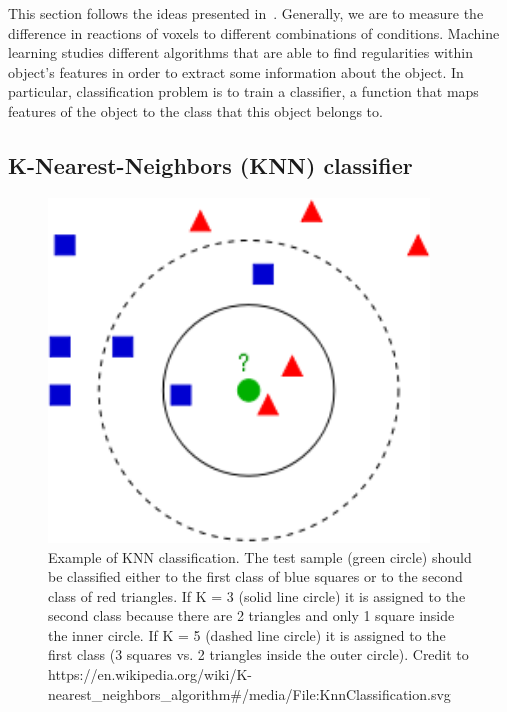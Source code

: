 
This section follows the ideas presented in~\cite{Kornysheva2014}. 
Generally, we are to measure the difference in reactions of voxels to different combinations of conditions. 
Machine learning studies different algorithms that are able to find regularities within object's features in order to extract some information about the object. In particular, classification problem is to train a classifier, a function that maps features of the object to the class that this object belongs to. 

\subsection{K-Nearest-Neighbors (KNN) classifier}

\begin{figure}[ht]
\centering
\begin{minipage}[c]{0.3\textwidth}
\includegraphics[width=0.9\textwidth]{220px-KnnClassification.png}
\end{minipage}
\begin{minipage}[c]{0.6\textwidth}
\caption{Example of KNN classification. The test sample (green circle) should be classified either to the first class of blue squares or to the second class of red triangles. If K = 3 (solid line circle) it is assigned to the second class because there are 2 triangles and only 1 square inside the inner circle. If K = 5 (dashed line circle) it is assigned to the first class (3 squares vs. 2 triangles inside the outer circle). Credit to https://en.wikipedia.org/wiki/K-nearest\_neighbors\_algorithm\#/media/File:KnnClassification.svg}
\label{fig:knn_example}
\end{minipage}
\end{figure}

